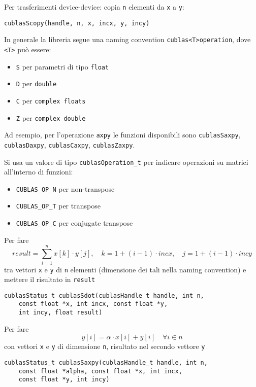 Per trasferimenti device-device: copia \texttt{n} elementi da \texttt{x} a \texttt{y}:
\begin{verbatim}
cublasScopy(handle, n, x, incx, y, incy)
\end{verbatim}

In generale la libreria segue una naming convention \texttt{cublas<T>operation}, dove \texttt{<T>} può essere: 
\begin{itemize}
	\item \texttt{S} per parametri di tipo \texttt{float}

	\item \texttt{D} per \texttt{double}

	\item \texttt{C} per \texttt{complex  floats}

	\item \texttt{Z} per \texttt{complex double}
\end{itemize}
Ad esempio, per l'operazione \texttt{axpy} le funzioni disponibili sono \texttt{cublasSaxpy}, \texttt{cublasDaxpy}, \texttt{cublasCaxpy}, \texttt{cublasZaxpy}.

Si usa un valore di tipo \texttt{cublasOperation\_t} per indicare operazioni su matrici all'interno di funzioni: 
\begin{itemize}
	\item \texttt{CUBLAS\_OP\_N} per non-transpose

	\item \texttt{CUBLAS\_OP\_T} per transpose

	\item \texttt{CUBLAS\_OP\_C} per conjugate transpose
\end{itemize}

Per fare
$$ result = \sum_{i=1}^{n} x[k] \cdot y[j], \quad k = 1 + (i-1) \cdot incx, \quad j = 1 + (i-1) \cdot incy $$
tra vettori \texttt{x} e \texttt{y} di \texttt{n} elementi (dimensione dei tali nella naming convention) e mettere il risultato in \texttt{result}
\begin{verbatim}
cublasStatus_t cublasSdot(cublasHandle_t handle, int n, 
    const float *x, int incx, const float *y, 
    int incy, float result)
\end{verbatim}

Per fare 
$$ y[i] = \alpha \cdot x[i] + y[i] \quad \forall i \in n $$
con vettori \texttt{x} e \texttt{y} di dimensione \texttt{n}, risultato nel secondo vettore \texttt{y}
\begin{verbatim}
cublasStatus_t cublasSaxpy(cublasHandle_t handle, int n,
    const float *alpha, const float *x, int incx, 
    const float *y, int incy)
\end{verbatim}

